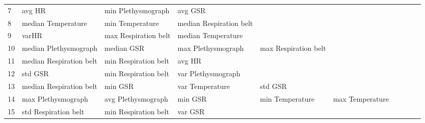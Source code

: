 \begin{landscape}
\begin{table}[]
\begin{tabular}{l|llllllll}
7        & avg HR                  & min Plethysmograph      & avg GSR                 &                         &                         &                       &                         &                         &                         &         \\
8        & median Temperature      & min Temperature         & median Respiration belt &                         &                         &                       &                         &                         &                         &         \\
9        & varHR                   & max Respiration belt    & median Temperature      &                         &                         &                       &                         &                         &                         &         \\
10       & median Plethysmograph   & median GSR              & max Plethysmograph      & max Respiration belt    &                         &                       &                         &                         &                         &         \\
11       & median Respiration belt & min Respiration belt    & avg HR                  &                         &                         &                       &                         &                         &                         &         \\
12       & std GSR                 & min Respiration belt    & var Plethysmograph      &                         &                         &                       &                         &                         &                         &         \\
13       & median Respiration belt & min GSR                 & var Temperature         & std GSR                 &                         &                       &                         &                         &                         &         \\
14       & max Plethysmograph      & avg Plethysmograph      & min GSR                 & min Temperature         & max Temperature         &                       &                         &                         &                         &         \\
15       & std Respiration belt    & min Respiration belt    & var GSR                 &                         &                         &                       &                         &                         &                         &         \\

\end{tabular}
\end{table}
\end{landscape}
